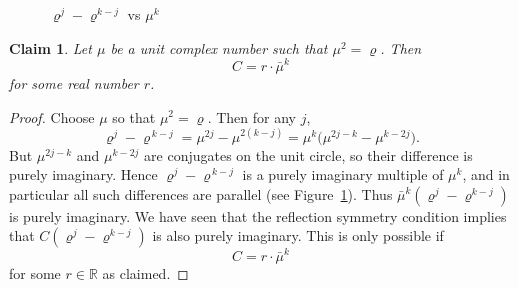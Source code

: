 \documentclass{article}
\newtheorem{claim}[theorem]{Claim}
\theoremstyle{definition}
\numberwithin{equation}{section}
\numberwithin{theorem}{section}
\newcommand{\ro}{\varrho}
\newcommand{\R}{\mathbb{R}}
\begin{document}
\begin{figure}
\centering
{}
\caption{$\ro^j - \ro^{k-j}$ vs $\mu^k$\label{pic:unit circle}}
\end{figure}



\begin{claim}
Let \(\mu\) be a unit complex number such that \(\mu^2=\ro\).  Then
\[
C = r\cdot\bar{\mu}^{k}
\]
for some real number \(r\).
\end{claim}






\begin{proof}
Choose \(\mu\) so that \(\mu^2=\ro\).  Then for any \(j\),
\[
\ro^j - \ro^{\,k-j}
= \mu^{2j} - \mu^{2(k-j)}
= \mu^k\bigl(\mu^{2j-k} - \mu^{k-2j}\bigr).
\]
But \(\mu^{2j-k}\) and \(\mu^{k-2j}\) are conjugates on the unit circle, so their difference is purely imaginary.  Hence \(\ro^j - \ro^{\,k-j}\) is a purely imaginary multiple of \(\mu^k\), and in particular all such differences are parallel (see Figure~\ref{pic:unit circle}). Thus $\bar{\mu}^k(\ro^j-\ro^{k-j})$ is purely imaginary.  We have seen that the reflection symmetry condition implies that $C(\ro^j-\ro^{k-j})$ is also purely imaginary. This is only possible if
\[
C = r\cdot\bar{\mu}^{k}
\]
for some $r\in \R$ as claimed.
\end{proof}
\end{document}
